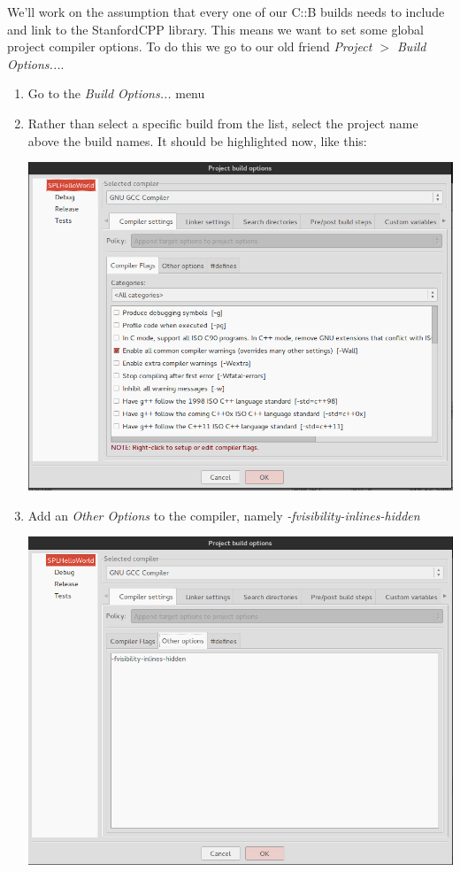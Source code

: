 \documentclass[10pt]{article}
\begin{document}
We'll work on the assumption that every one of our C::B builds needs to include and link to the StanfordCPP library. This means we want to set some global project compiler options. To do this we go to our old friend \textit{Project $>$ Build Options...}. 
\begin{enumerate}
\item Go to the \textit{Build Options...} menu
\item Rather than select a specific build from the list, select the project name above the build names. It should be highlighted now, like this:

\vspace{.1in}
\begin{center}
\includegraphics[scale=.4]{buildOpts-proj.png}
\end{center}
\vspace{.1in}

\item Add an \textit{Other Options} to the compiler, namely \textit{-fvisibility-inlines-hidden} 

\vspace{.1in}
\begin{center}
\includegraphics[scale=.4]{scpplib-compopts.png}
\end{center}
\vspace{.1in}


\end{enumerate}
\end{document}
